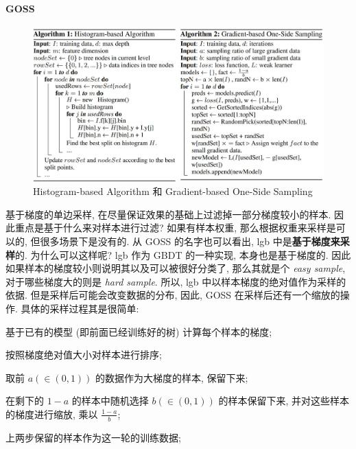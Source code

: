 \paragraph{GOSS}

\begin{figure}[h]
	\centering
	\includegraphics[width=\textwidth]{pics/goss.jpg}
	\caption{Histogram-based Algorithm 和 Gradient-based One-Side Sampling}
	\label{fig:goss}
\end{figure}

基于梯度的单边采样, 在尽量保证效果的基础上过滤掉一部分梯度较小的样本. 因此重点是基于什么来对样本进行过滤? 如果有样本权重, 那么根据权重来采样是可以的, 但很多场景下是没有的. 从 GOSS 的名字也可以看出, lgb 中是\textbf{基于梯度来采样}的. 为什么可以这样呢? lgb 作为 GBDT 的一种实现, 本身也是基于梯度的. 因此如果样本的梯度较小则说明其以及可以被很好分类了, 那么其就是个 \textit{easy sample}, 对于哪些梯度大的则是 \textit{hard sample}. 所以, lgb 中以样本梯度的绝对值作为采样的依据. 但是采样后可能会改变数据的分布, 因此, GOSS 在采样后还有一个缩放的操作. 具体的采样过程其是很简单:
\begin{myitemize}	
	\item 基于已有的模型 (即前面已经训练好的树) 计算每个样本的梯度;
	
	\item 按照梯度绝对值大小对样本进行排序;
	
	\item 取前 $a (\in (0, 1))$ 的数据作为大梯度的样本, 保留下来;
	
	\item 在剩下的 $1-a$ 的样本中随机选择 $b (\in (0, 1))$ 的样本保留下来, 并对这些样本的梯度进行缩放, 乘以 $\frac{1 - a}{b}$;
	
	\item 上两步保留的样本作为这一轮的训练数据;
\end{myitemize}

